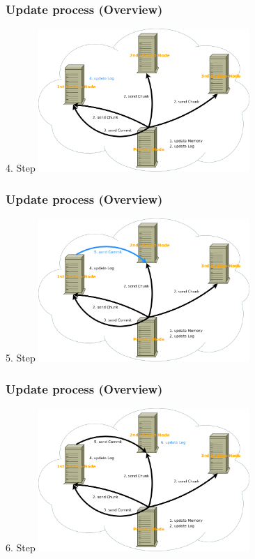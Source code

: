 \documentclass{beamer}
\begin{document}
	\begin{frame}
		\frametitle{Update process (Overview)}

		\begin{block}{4. Step}
			\center\includegraphics[width=8cm]{./img/Log_Overview_04}
		\end{block}
	\end{frame}

	\begin{frame}
		\frametitle{Update process (Overview)}

		\begin{block}{5. Step}
			\center\includegraphics[width=8cm]{./img/Log_Overview_05}
		\end{block}
	\end{frame}

	\begin{frame}
		\frametitle{Update process (Overview)}

		\begin{block}{6. Step}
			\center\includegraphics[width=8cm]{./img/Log_Overview_06}
		\end{block}
	\end{frame}
\end{document}
